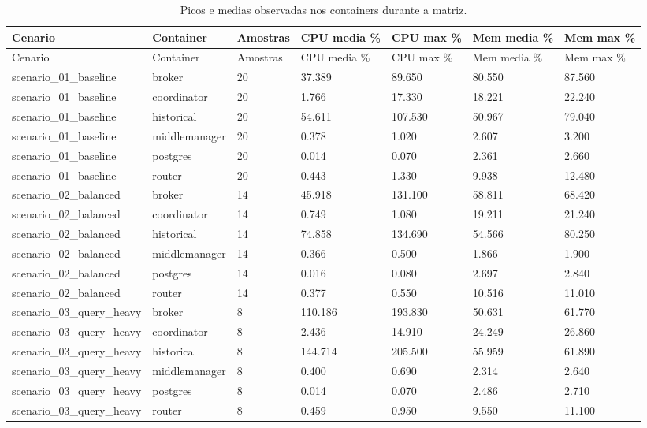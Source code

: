{
\footnotesize
\setlength{\tabcolsep}{4pt}
\renewcommand{\arraystretch}{1.15}
\begin{longtable}{p{}p{}p{}p{}p{}p{}p{}}
\caption{Picos e medias observadas nos containers durante a matriz.}\\
\toprule
Cenario & Container & Amostras & CPU media \% & CPU max \% & Mem media \% & Mem max \% \\
\midrule
\endfirsthead
\toprule
Cenario & Container & Amostras & CPU media \% & CPU max \% & Mem media \% & Mem max \% \\
\midrule
\endhead
scenario\_01\_baseline & broker & 20 & 37.389 & 89.650 & 80.550 & 87.560 \\
scenario\_01\_baseline & coordinator & 20 & 1.766 & 17.330 & 18.221 & 22.240 \\
scenario\_01\_baseline & historical & 20 & 54.611 & 107.530 & 50.967 & 79.040 \\
scenario\_01\_baseline & middlemanager & 20 & 0.378 & 1.020 & 2.607 & 3.200 \\
scenario\_01\_baseline & postgres & 20 & 0.014 & 0.070 & 2.361 & 2.660 \\
scenario\_01\_baseline & router & 20 & 0.443 & 1.330 & 9.938 & 12.480 \\
scenario\_02\_balanced & broker & 14 & 45.918 & 131.100 & 58.811 & 68.420 \\
scenario\_02\_balanced & coordinator & 14 & 0.749 & 1.080 & 19.211 & 21.240 \\
scenario\_02\_balanced & historical & 14 & 74.858 & 134.690 & 54.566 & 80.250 \\
scenario\_02\_balanced & middlemanager & 14 & 0.366 & 0.500 & 1.866 & 1.900 \\
scenario\_02\_balanced & postgres & 14 & 0.016 & 0.080 & 2.697 & 2.840 \\
scenario\_02\_balanced & router & 14 & 0.377 & 0.550 & 10.516 & 11.010 \\
scenario\_03\_query\_heavy & broker & 8 & 110.186 & 193.830 & 50.631 & 61.770 \\
scenario\_03\_query\_heavy & coordinator & 8 & 2.436 & 14.910 & 24.249 & 26.860 \\
scenario\_03\_query\_heavy & historical & 8 & 144.714 & 205.500 & 55.959 & 61.890 \\
scenario\_03\_query\_heavy & middlemanager & 8 & 0.400 & 0.690 & 2.314 & 2.640 \\
scenario\_03\_query\_heavy & postgres & 8 & 0.014 & 0.070 & 2.486 & 2.710 \\
scenario\_03\_query\_heavy & router & 8 & 0.459 & 0.950 & 9.550 & 11.100 \\
\bottomrule
\end{longtable}
}
